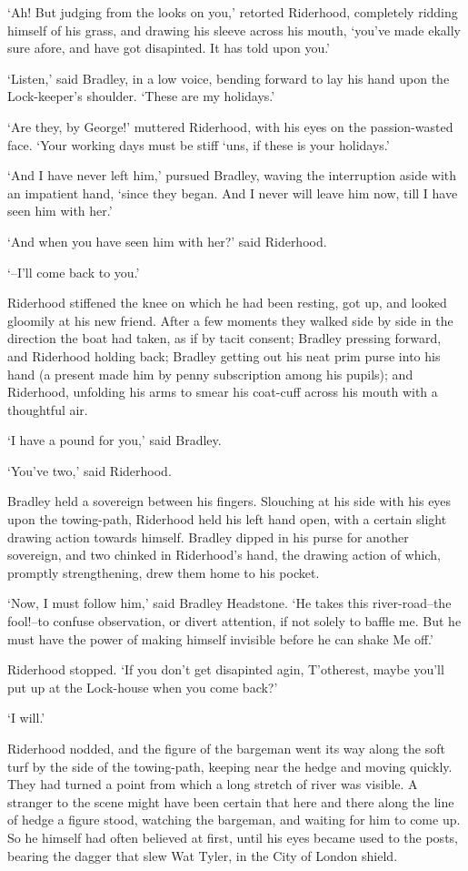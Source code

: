 ‘Ah! But judging from the looks on you,’ retorted Riderhood, completely
ridding himself of his grass, and drawing his sleeve across his mouth,
‘you’ve made ekally sure afore, and have got disapinted. It has told
upon you.’

‘Listen,’ said Bradley, in a low voice, bending forward to lay his hand
upon the Lock-keeper’s shoulder. ‘These are my holidays.’

‘Are they, by George!’ muttered Riderhood, with his eyes on the
passion-wasted face. ‘Your working days must be stiff ‘uns, if these is
your holidays.’

‘And I have never left him,’ pursued Bradley, waving the interruption
aside with an impatient hand, ‘since they began. And I never will leave
him now, till I have seen him with her.’

‘And when you have seen him with her?’ said Riderhood.

‘--I’ll come back to you.’

Riderhood stiffened the knee on which he had been resting, got up, and
looked gloomily at his new friend. After a few moments they walked side
by side in the direction the boat had taken, as if by tacit consent;
Bradley pressing forward, and Riderhood holding back; Bradley getting
out his neat prim purse into his hand (a present made him by penny
subscription among his pupils); and Riderhood, unfolding his arms to
smear his coat-cuff across his mouth with a thoughtful air.

‘I have a pound for you,’ said Bradley.

‘You’ve two,’ said Riderhood.

Bradley held a sovereign between his fingers. Slouching at his side with
his eyes upon the towing-path, Riderhood held his left hand open, with
a certain slight drawing action towards himself. Bradley dipped in his
purse for another sovereign, and two chinked in Riderhood’s hand, the
drawing action of which, promptly strengthening, drew them home to his
pocket.

‘Now, I must follow him,’ said Bradley Headstone. ‘He takes this
river-road--the fool!--to confuse observation, or divert attention, if
not solely to baffle me. But he must have the power of making himself
invisible before he can shake Me off.’

Riderhood stopped. ‘If you don’t get disapinted agin, T’otherest, maybe
you’ll put up at the Lock-house when you come back?’

‘I will.’

Riderhood nodded, and the figure of the bargeman went its way along the
soft turf by the side of the towing-path, keeping near the hedge and
moving quickly. They had turned a point from which a long stretch of
river was visible. A stranger to the scene might have been certain that
here and there along the line of hedge a figure stood, watching the
bargeman, and waiting for him to come up. So he himself had often
believed at first, until his eyes became used to the posts, bearing the
dagger that slew Wat Tyler, in the City of London shield.

